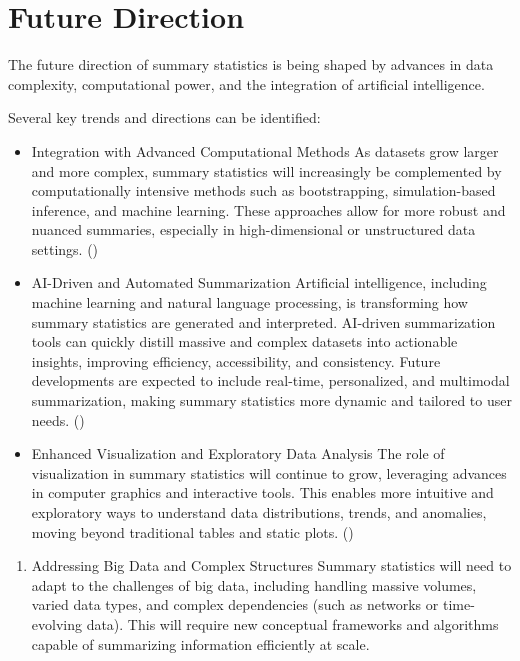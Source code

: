 \documentclass[
  man,
  floatsintext,
  longtable,
  nolmodern,
  notxfonts,
  notimes,
  colorlinks=true,linkcolor=blue,citecolor=blue,urlcolor=blue]{apa7}
\providecommand{\tightlist}{%
  \setlength{\itemsep}{0pt}\setlength{\parskip}{0pt}}
\begin{document}
\newpage

\section{Future Direction}\label{future-direction}

The future direction of summary statistics is being shaped by advances
in data complexity, computational power, and the integration of
artificial intelligence.

Several key trends and directions can be identified:

\begin{itemize}
\item
  Integration with Advanced Computational Methods As datasets grow
  larger and more complex, summary statistics will increasingly be
  complemented by computationally intensive methods such as
  bootstrapping, simulation-based inference, and machine learning. These
  approaches allow for more robust and nuanced summaries, especially in
  high-dimensional or unstructured data settings.
  ()
\item
  AI-Driven and Automated Summarization Artificial intelligence,
  including machine learning and natural language processing, is
  transforming how summary statistics are generated and interpreted.
  AI-driven summarization tools can quickly distill massive and complex
  datasets into actionable insights, improving efficiency,
  accessibility, and consistency. Future developments are expected to
  include real-time, personalized, and multimodal summarization, making
  summary statistics more dynamic and tailored to user needs.
  ()
\item
  Enhanced Visualization and Exploratory Data Analysis The role of
  visualization in summary statistics will continue to grow, leveraging
  advances in computer graphics and interactive tools. This enables more
  intuitive and exploratory ways to understand data distributions,
  trends, and anomalies, moving beyond traditional tables and static
  plots. ()
\end{itemize}

\begin{enumerate}
\def\labelenumi{\arabic{enumi}.}
\setcounter{enumi}{3}
\tightlist
\item
  Addressing Big Data and Complex Structures Summary statistics will
  need to adapt to the challenges of big data, including handling
  massive volumes, varied data types, and complex dependencies (such as
  networks or time-evolving data). This will require new conceptual
  frameworks and algorithms capable of summarizing information
  efficiently at scale.
\end{enumerate}
\end{document}
